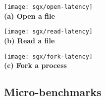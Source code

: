 \begin{figure*}[t!]
\centering

\begin{minipage}{.45\textwidth}
\centering
\footnotesize
\vspace{6pt}
\texttt{[image: sgx/open-latency]}\\
\vspace{3pt}
{\bf (a) Open a file}
\vspace{6pt}
\end{minipage}
\begin{minipage}{.45\textwidth}
\centering
\footnotesize
\vspace{6pt}
\texttt{[image: sgx/read-latency]}\\
\vspace{3pt}
{\bf (b) Read a file}
\vspace{6pt}
\end{minipage}
\begin{minipage}{.45\textwidth}
\centering
\footnotesize
\vspace{6pt}
\texttt{[image: sgx/fork-latency]}\\
\vspace{3pt}
{\bf (c) Fork a process}
\vspace{6pt}
\end{minipage}

\caption{Latency of some expensive system calls in \graphenesgx{}, including opening and reading a secured (authenticated) file, and forking a new process. The results are compared with native Linux and \graphene{}.}
\label{fig:syscall}
\end{figure*}


\subsection{Micro-benchmarks}


